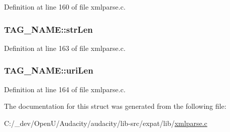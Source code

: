 Definition at line 160 of file xmlparse.\+c.

\subsubsection[{\texorpdfstring{str\+Len}{strLen}}]{ T\+A\+G\+\_\+\+N\+A\+M\+E\+::str\+Len}\hypertarget{struct_t_a_g___n_a_m_e_a744e3db439c6031240b5d857111e6c4e}{}\label{struct_t_a_g___n_a_m_e_a744e3db439c6031240b5d857111e6c4e}


Definition at line 163 of file xmlparse.\+c.

\subsubsection[{\texorpdfstring{uri\+Len}{uriLen}}]{ T\+A\+G\+\_\+\+N\+A\+M\+E\+::uri\+Len}\hypertarget{struct_t_a_g___n_a_m_e_ae5bffa95a259b280dca1ddd9f69819bd}{}\label{struct_t_a_g___n_a_m_e_ae5bffa95a259b280dca1ddd9f69819bd}


Definition at line 164 of file xmlparse.\+c.



The documentation for this struct was generated from the following file\+:\begin{DoxyCompactItemize}
\item 
C\+:/\+\_\+dev/\+Open\+U/\+Audacity/audacity/lib-\/src/expat/lib/\hyperlink{xmlparse_8c}{xmlparse.\+c}\end{DoxyCompactItemize}
